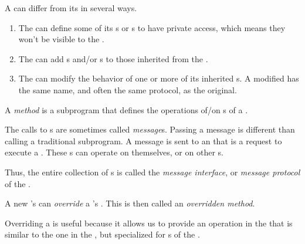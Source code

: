A  can differ from its  in several ways.
\begin{enumerate}[noitemsep]
\item The  can define some of its s or s to have private access, which means they won't be visible to the .
\item The  can add s and/or s to those inherited from the .
\item The  can modify the behavior of one or more of its inherited s. A modified  has the same name, and often the same protocol, as the original.
\end{enumerate}

\begin{definition}[Method]\label{def:OOP_Method}
  A \emph{method} is a subprogram that defines the operations of/on s of a .
\end{definition}

\begin{definition}[Message]\label{def:OOP_Message}
  The calls to s are sometimes called \emph{message}s.
  Passing a message is different than calling a traditional subprogram.
  A message is sent to an  that is a request to execute a .
  These s can operate on themselves, or on other s.
\end{definition}

\begin{definition}\label{def:OOP_Message_Interface}
  Thus, the entire collection of s is called the \emph{message interface}, or \emph{message protocol} of the .
\end{definition}

\begin{definition}[Override]\label{def:OOP_Override}
  A new 's  can \emph{override} a 's .
  This is then called an \emph{overridden method}.

  Overriding a  is useful because it allows us to provide an operation in the  that is similar to the one in the , but specialized for s of the .
\end{definition}


